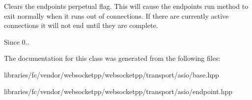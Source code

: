Clears the endpoint\textquotesingle{}s perpetual flag. This will cause the endpoint\textquotesingle{}s run method to exit normally when it runs out of connections. If there are currently active connections it will not end until they are complete.

\begin{DoxySince}{Since}
0.. 
\end{DoxySince}


The documentation for this class was generated from the following files\+:\begin{DoxyCompactItemize}
\item 
libraries/fc/vendor/websocketpp/websocketpp/transport/asio/base.\+hpp\item 
libraries/fc/vendor/websocketpp/websocketpp/transport/asio/endpoint.\+hpp\end{DoxyCompactItemize}
